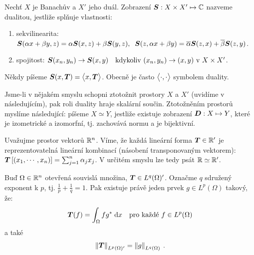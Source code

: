 \begin{definition}[Dualita]
Nechť $X$ je Banachův a $X'$ jeho duál. Zobrazení $\boldsymbol{S} : X \times X' \mapsto \mathbb{C}$ nazveme dualitou, jestliže splňuje vlastnosti: \begin{enumerate}
    \item sekvilinearita: $\boldsymbol{S}(\alpha x + \beta y, z) = \alpha \boldsymbol{S}(x,z) + \beta \boldsymbol{S}(y,z), \;\; \boldsymbol{S}(z,\alpha x + \beta y) = \overline{\alpha} \boldsymbol{S}(z,x) + \overline{\beta} \boldsymbol{S}(z,y)$.
    
    \item spojitost: $\boldsymbol{S}(x_n,y_n) \rightarrow \boldsymbol{S}(x,y) \quad \text{kdykoliv } (x_n,y_n) \rightarrow (x,y) \text{ v } X \times X'$.
\end{enumerate}
Někdy píšeme $\boldsymbol{S}(x, \boldsymbol{T}) = \big< x, \boldsymbol{T} \big>$. Obecně je často $\big< \cdot, \cdot \big>$ symbolem duality.
\end{definition}

\begin{remark}
Jsme-li v nějakém smyslu schopni ztotožnit prostory $X$ a $X'$ (uvidíme v následujícím), pak roli duality hraje skalární součin. Ztotožněním prostorů myslíme následující: píšeme $X \simeq Y$, jestliže existuje zobrazení $\boldsymbol{D}: X \mapsto Y$, které je izometrické a izomorfní, tj. zachovává normu a je bijektivní.
\end{remark}

\begin{example}

Uvažujme prostor vektorů $\mathbb{R}^n$. Víme, že každá lineární forma $\boldsymbol{T} \in \mathbb{R}'$ je reprezentovatelná lineární kombinací (násobení transponovaným vektorem): $\boldsymbol{T} \left[ (x_1, \cdots, x_n) \right] = \sum_{j=1}^n \alpha_j x_j$. V určitém smyslu lze tedy psát $\mathbb{R} \simeq \mathbb{R}'$. 
\end{example}

\begin{theorem}
Buď $\Omega \in \mathbb{R}^n $ otevřená souvislá množina, $\boldsymbol{T} \in L^q(\Omega)'$. Označme $q$ sdružený exponent k $p$, tj. $\frac{1}{p} + \frac{1}{q} =1$. Pak existuje právě jeden prvek $g \in L^p(\Omega)$ takový, že:
\begin{align*}
\boldsymbol{T}(f) = \int_\Omega f g^* \;\mathrm{d}x \quad \text{pro každé } f \in L^p(\Omega)
\end{align*}
a také \begin{align*}
    \left\lVert\boldsymbol{T}\right\rVert_{L^p(\Omega)'} = \left\lVert g\right\rVert_{L^q(\Omega)} \:.
\end{align*}   
\end{theorem}

